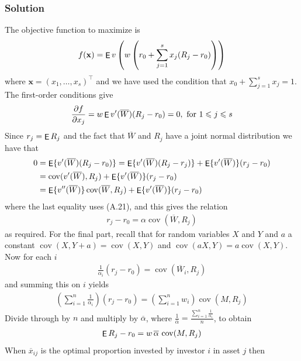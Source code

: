 \documentclass[10pt]{beamer}
\newcommand{\ds}{\displaystyle}
\DeclareMathOperator\expc{{\sf E}}
\DeclareMathOperator\cov{cov}
\theoremstyle{definition}
\begin{document}
\begin{frame}[allowframebreaks]
  \frametitle{Solution}
  The objective function to maximize is
  \begin{align*}
    f(\mathbf{x}) = \expc v\left(w\left(r_0 + \sum_{j=1}^s x_j(R_j - r_0)\right)\right)
  \end{align*}
  where $\mathbf{x} = (x_1,\ldots,x_s)^\top$ and we have used the condition that $x_0 + \sum_{j=1}^s x_j = 1$. The first-order conditions give
  \begin{align*}
    \frac{\partial f}{\partial x_j} = w\expc{v'(\overline{W})(R_j - r_0)} = 0, \text{ for } 1 \leqslant j \leqslant s
  \end{align*}
  Since $r_j = \expc{R_j}$ and the fact that $\overline{W}$ and $R_j$ have a joint normal distribution we have that
  \begin{align*}
    0 &= \expc\{v'(\overline{W})(R_j - r_0)\} = \expc\{v'(\overline{W})(R_j - r_j)\} + \expc\{v'(\overline{W})\}(r_j - r_0) \\
      &= \cov(v'(\overline{W}), R_j) + \expc\{v'(\overline{W})\}(r_j - r_0) \\
      &= \expc\{v''(\overline{W})\}\cov(\overline{W}, R_j) + \expc\{v'(\overline{W})\}(r_j - r_0)
    \end{align*}
  where the last equality uses (A.21), and this gives the relation
  \begin{align*}
    r_j - r_0 = \alpha \cov(\overline{W}, R_j)
  \end{align*}
  as required. For the final part, recall that for random variables $X$ and $Y$ and $a$ a constant $\cov(X, Y + a) = \cov(X, Y)$ and $\cov(aX, Y) = a\cov(X,Y)$. Now for each $i$
  \begin{align*}
    \frac{1}{\alpha_i}(r_j - r_0) = \cov(\overline{W}_i, R_j)
  \end{align*}
  and summing this on $i$ yields
  \begin{align*}
    \left(\sum_{i=1}^n\frac{1}{\alpha_i}\right)(r_j - r_0) = \left(\sum_{i=1}^n w_i\right)\cov(M, R_j)
  \end{align*}
  Divide through by $n$ and multiply by $\overline{\alpha}$, where $\ds\frac{1}{\overline{\alpha}} = \frac{\sum_{i=1}^n\frac{1}{\alpha_i}}{n}$, to obtain
  \begin{align*}
    \expc{R_j} - r_0 = w\,\overline{\alpha}\,\cov(M, R_j)
  \end{align*}
  When $\overline{x}_{ij}$ is the optimal proportion invested by investor $i$ in asset $j$ then
  \begin{align*}

\end{align*}
\end{frame}
\end{document}
